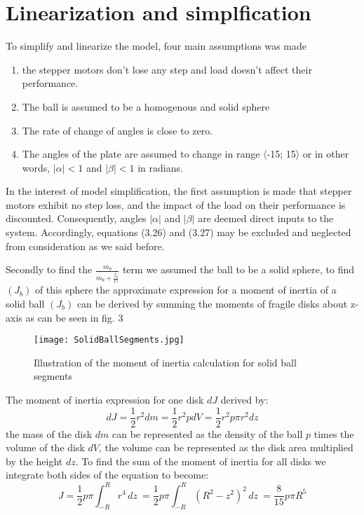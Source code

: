 \section{Linearization and simplfication}

To simplify and linearize the model, four main assumptions was made 
\begin{enumerate}
    \item the stepper motors don’t lose any step and load doesn’t affect their performance.
    \item The ball is assumed to be a homogenous and solid sphere
    \item The rate of change of angles is close to zero.
    \item The angles of the plate are assumed to change in range 〈-15; 15〉 or in other words, $|\alpha| < 1$ and $|\beta| < 1$ in radians.
\end{enumerate}
In the interest of model simplification, the first assumption is made that stepper motors exhibit no step loss, and the impact of the load on their performance is discounted. Consequently, angles $|\alpha|$ and $|\beta|$ are deemed direct inputs to the system. Accordingly, equations (3.26) and (3.27) may be excluded and neglected from consideration as we said before.

Secondly to find the $\frac{m_b}{m_b+\frac{j_b}{r^2}}$ term we assumed the ball to be a  solid sphere, to find  $(J_b)$ of this sphere the approximate expression for a moment of inertia of a solid ball $(J_b)$ can be derived by summing the moments of fragile disks about z-axis as can be seen in fig. 3
\begin{figure}[h]
\centering
\texttt{[image: SolidBallSegments.jpg]}
\caption{Illustration of the moment of inertia calculation for solid ball segments}
\end{figure}
The moment of inertia expression for one disk $dJ$ derived by:
\begin{equation}
dJ = \frac{1}{2} r^2 dm = \frac{1}{2}r^2pdV = \frac{1}{2}r^2p\pi r^2dz 
\end{equation}
the mass of the disk $dm$ can be represented as the density of the ball $p$ times the volume of the disk $dV$, the volume can be represented as the disk area multiplied by the height $dz$.
To find the sum of the moment of inertia for all disks we integrate both sides of the equation to become:
\begin{equation}
J = \frac{1}{2}p\pi \int_{-R}^{R} r^4 \,dz \ = \frac{1}{2}p\pi \int_{-R}^{R} (R^2-z^2)^2 \,dz \ = \frac{8}{15} p\pi R^5 \end{equation}

